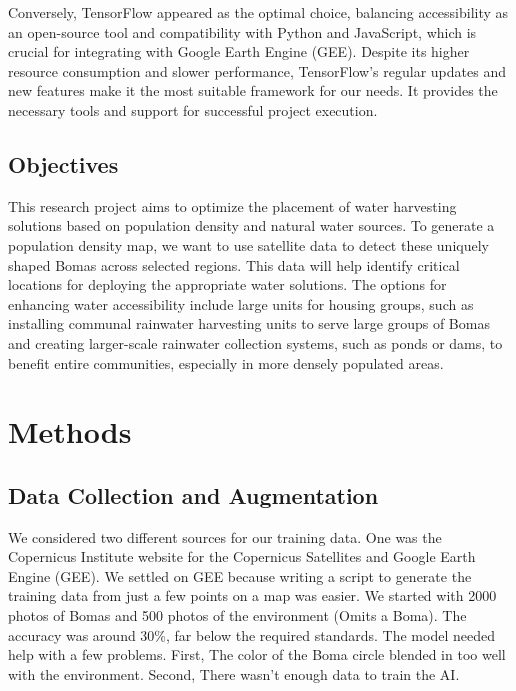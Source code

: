 \documentclass[10pt]{article}
\begin{document}
Conversely, TensorFlow appeared as the optimal choice, balancing accessibility as an open-source tool and compatibility with Python and JavaScript, which is crucial for integrating with Google Earth Engine (GEE).
Despite its higher resource consumption and slower performance, TensorFlow's regular updates and new features make it the most suitable framework for our needs. It provides the necessary tools and support for successful project execution.

\subsection{Objectives}

This research project aims to optimize the placement of water harvesting solutions based on population density and natural water sources. To generate a population density map, we want to use satellite data to detect these uniquely shaped Bomas across selected regions. This data will help identify critical locations for deploying the appropriate water solutions. The options for enhancing water accessibility include large units for housing groups, such as installing communal rainwater harvesting units to serve large groups of Bomas and creating larger-scale rainwater collection systems, such as ponds or dams, to benefit entire communities, especially in more densely populated areas.


\section{Methods}
\label{methods}

\subsection{Data Collection and Augmentation}
\label{data}

We considered two different sources for our training data. One was the Copernicus Institute website for the Copernicus Satellites and Google Earth Engine (GEE). We settled on GEE because writing a script to generate the training data from just a few points on a map was easier. We started with 2000 photos of Bomas and 500 photos of the environment (Omits a Boma). The accuracy was around 30\%, far below the required standards. The model needed help with a few problems. First, The color of the Boma circle blended in too well with the environment. Second, There wasn’t enough data to train the AI.
\end{document}
